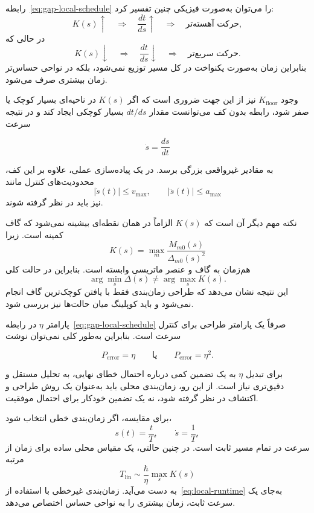 رابطه~\eqref{eq:gap-local-schedule} را می‌توان به‌صورت فیزیکی چنین
تفسیر کرد:
\begin{equation}
	K(s)\uparrow
	\quad\Longrightarrow\quad
	\frac{dt}{ds}\uparrow
	\quad\Longrightarrow\quad
	\text{حرکت آهسته‌تر},
\end{equation}
در حالی که
\begin{equation}
	K(s)\downarrow
	\quad\Longrightarrow\quad
	\frac{dt}{ds}\downarrow
	\quad\Longrightarrow\quad
	\text{حرکت سریع‌تر}.
\end{equation}
بنابراین زمان به‌صورت یکنواخت در کل مسیر توزیع نمی‌شود، بلکه در
نواحی حساس‌تر زمان بیشتری صرف می‌شود.

وجود $K_{\mathrm{floor}}$ نیز از این جهت ضروری است که اگر $K(s)$
در ناحیه‌ای بسیار کوچک یا صفر شود، رابطه بدون کف می‌توانست مقدار
$dt/ds$ بسیار کوچکی ایجاد کند و در نتیجه سرعت

$$
\dot{s}=\frac{ds}{dt}
$$

به مقادیر غیرواقعی بزرگی برسد. در یک پیاده‌سازی عملی، علاوه بر این
کف، محدودیت‌های کنترل مانند
\begin{equation}
	|\dot{s}(t)|\leq v_{\max},
	\qquad
	|\ddot{s}(t)|\leq a_{\max}
\end{equation}
نیز باید در نظر گرفته شوند.

نکته مهم دیگر آن است که $K(s)$ الزاماً در همان نقطه‌ای بیشینه
نمی‌شود که گاف کمینه است. زیرا
\begin{equation}
	K(s)=
	\max_m
	\frac{M_{m0}(s)}{\Delta_{m0}(s)^2}
\end{equation}
هم‌زمان به گاف و عنصر ماتریسی وابسته است. بنابراین در حالت کلی
\begin{equation}
	\arg\min_s\Delta(s)
	\neq
	\arg\max_sK(s).
\end{equation}
این نتیجه نشان می‌دهد که طراحی زمان‌بندی فقط با یافتن کوچک‌ترین
گاف انجام نمی‌شود و باید کوپلینگ میان حالت‌ها نیز بررسی شود.

پارامتر $\eta$ در رابطه~\eqref{eq:gap-local-schedule} صرفاً یک
پارامتر طراحی برای کنترل سرعت است. بنابراین به‌طور کلی نمی‌توان
نوشت

$$
P_{\mathrm{error}}=\eta
\qquad\text{یا}\qquad
P_{\mathrm{error}}=\eta^2.
$$

برای تبدیل $\eta$ به یک تضمین کمی درباره احتمال خطای نهایی، به
تحلیل مستقل و دقیق‌تری نیاز است. از این رو، زمان‌بندی محلی باید
به‌عنوان یک روش طراحی و اکتشاف در نظر گرفته شود، نه یک تضمین
خودکار برای احتمال موفقیت.

برای مقایسه، اگر زمان‌بندی خطی انتخاب شود،
\begin{equation}
	s(t)=\frac{t}{T},
	\qquad
	\dot{s}=\frac{1}{T},
\end{equation}
سرعت در تمام مسیر ثابت است. در چنین حالتی، یک مقیاس محلی ساده
برای زمان از مرتبه
\begin{equation}
	T_{\mathrm{lin}}
	\sim
	\frac{\hbar}{\eta}\max_s K(s)
\end{equation}
به دست می‌آید. زمان‌بندی غیرخطی با استفاده از~\eqref{eq:local-runtime}
به‌جای یک سرعت ثابت، زمان بیشتری را به نواحی حساس اختصاص می‌دهد.

